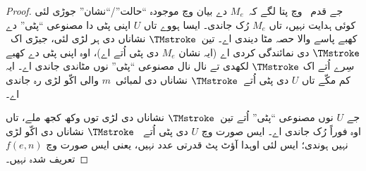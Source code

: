 \documentclass[../../../include/open-logic-section]{subfiles}
\begin{document}
\begin{proof}
  جے قدم~ وچ پتا لگے کہ~$M_e$ دے
  بیان وچ موجودہ “حالت”/“نشان” جوڑی لئی کوئی ہدایت
  نہیں، تاں $M_e$ رُک جاندی۔ ایسا ہووے تاں $U$
  اپنی پٹی دا مصنوعی “پٹی” دے کھبے پاسے والا حصہ
  مٹا دیندی اے۔ تین~$\TMstroke$ نشاناں دی ہر لڑی
  لئی، جیڑی اک~$\TMstroke$ دی نمائندگی کردی اے
  (ایہ نشان $M_e$ دی پٹی اُتے اے)، اوہ اپنی پٹی دے
  کھبے سِرے اُتے اک $\TMstroke$ لکھدی تے نال نال مصنوعی
  “پٹی” نوں مٹاندی جاندی اے۔ ایہ کم مکّے تاں
  $U$ دی پٹی اُتے~$\TMstroke$ نشاناں دی
  لمبائی~$m$ والی اکّو لڑی رہ جاندی اے۔
  
  جے $U$ نوں مصنوعی “پٹی” اُتے تین~$\TMstroke$
  نشاناں دی لڑی توں وکھ کجھ ملے، تاں اوہ فوراً
  رُک جاندی اے۔ ایس صورت وچ $U$ دی پٹی اُتے
  ~$\TMstroke$ نشاناں دی اکّو لڑی نہیں ہوندی؛
  ایس لئی اوہدا آؤٹ پٹ قدرتی عدد نہیں، یعنی
  ایس صورت وچ $f(e,n)$ تعریف شدہ نہیں۔
\end{proof}
\end{document}
